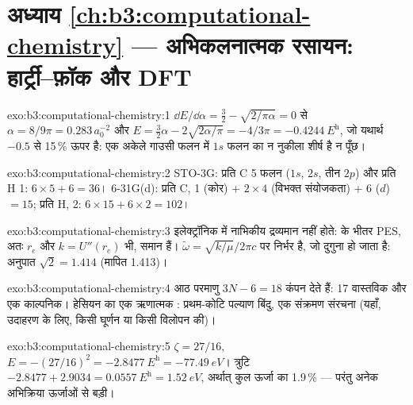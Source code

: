 \section*{अध्याय \ref{ch:b3:computational-chemistry} --- अभिकलनात्मक रसायन: हार्ट्री--फ़ॉक और DFT}

\begin{solution}{exo:b3:computational-chemistry:1}
$\dd E/\dd\alpha = \frac32 - \sqrt{2/\pi\alpha} = 0$ से $\alpha = 8/9\pi = 0.283\,
a_0^{-2}$ और $E = \frac32\alpha - 2\sqrt{2\alpha/\pi} = -4/3\pi = \qty{-0.4244}{\hartree}$,
जो यथार्थ $-0.5$ से 15\,\% ऊपर है: एक अकेले गाउसी फलन में $1s$ फलन का न नुकीला शीर्ष है
न पूँछ।
\end{solution}

\begin{solution}{exo:b3:computational-chemistry:2}
STO-3G: प्रति C 5 फलन ($1s$, $2s$, तीन $2p$) और प्रति H 1: $6 \times 5 + 6 =
36$। 6-31G(d): प्रति C, 1 (कोर) + $2 \times 4$ (विभक्त संयोजकता) + 6 ($d$) $= 15$;
प्रति H, 2: $6 \times 15 + 6 \times 2 = 102$।
\end{solution}

\begin{solution}{exo:b3:computational-chemistry:3}
इलेक्ट्रॉनिक  में नाभिकीय द्रव्यमान नहीं होते:  के भीतर PES, अतः $r_e$ और $k = U''(r_e)$ भी,
समान हैं। $\tilde\omega = \sqrt{k/\mu}/2\pi c$  पर निर्भर है, जो
दुगुना हो जाता है: अनुपात $\sqrt2 = 1.414$ (मापित 1.413)।
\end{solution}

\begin{solution}{exo:b3:computational-chemistry:4}
आठ परमाणु $3N - 6 = 18$ कंपन देते हैं: 17 वास्तविक और एक काल्पनिक। हेसियन का एक
ऋणात्मक : प्रथम-कोटि पल्याण बिंदु, एक संक्रमण
संरचना (यहाँ, उदाहरण के लिए, किसी घूर्णन या किसी विलोपन की)।
\end{solution}

\begin{solution}{exo:b3:computational-chemistry:5}
$\zeta = 27/16$, $E = -(27/16)^2 = \qty{-2.8477}{\hartree} = \qty{-77.49}{eV}$।
त्रुटि $-2.8477 + 2.9034 = \qty{0.0557}{\hartree} = \qty{1.52}{eV}$, अर्थात्
कुल ऊर्जा का 1.9\,\% --- परंतु अनेक अभिक्रिया ऊर्जाओं से बड़ी।
\end{solution}


